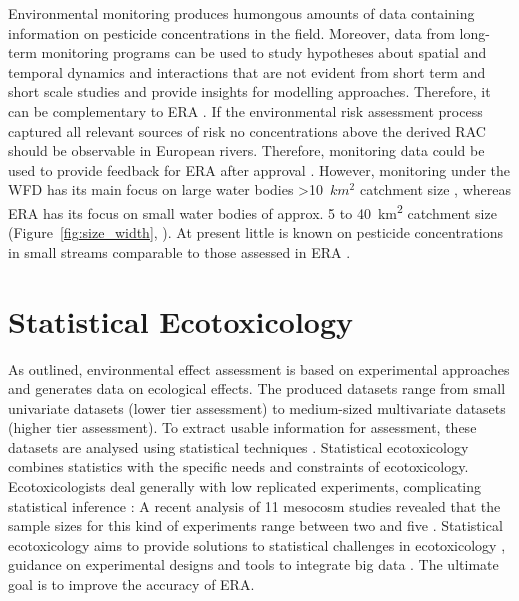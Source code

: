 Environmental monitoring produces humongous amounts of data containing information on pesticide concentrations in the field.
Moreover, data from long-term monitoring programs can be used to study hypotheses about spatial and temporal dynamics and interactions that are not evident from short term and short scale studies \citep{gitzen_design_2012} and provide insights for modelling approaches. 
Therefore, it can be complementary to ERA \citep{suter_ecological_2007}.
If the environmental risk assessment process captured all relevant sources of risk no concentrations above the derived RAC should be observable in European rivers. 
Therefore, monitoring data could be used to provide feedback for ERA after approval \citep{knauer_pesticides_2016}. 
However, monitoring under the WFD has its main focus on large water bodies \textgreater 10~$km^2$ catchment size \citep{european_union_directive_2000}, whereas ERA has its focus on small water bodies of approx. 5 to 40~km\textsuperscript{2} catchment size (Figure~\ref{fig:size_width}, \citet{european_union_regulation_2009, brock_aquatic_2006}).
At present little is known on pesticide concentrations in small streams comparable to those assessed in ERA \citep{lorenz_specifics_2016, biggs_importance_2016}. 



\section{Statistical Ecotoxicology}

As outlined, environmental effect assessment is based on experimental approaches and generates data on ecological effects.
The produced datasets range from small univariate datasets (lower tier assessment) to medium-sized multivariate datasets (higher tier assessment).
To extract usable information for assessment, these datasets are analysed using statistical techniques \citep{newman_quantitative_2012}. 
Statistical ecotoxicology combines statistics with the specific needs and constraints of ecotoxicology. 
Ecotoxicologists deal generally with low replicated experiments, complicating statistical inference \citep{van_der_hoeven_power_1998}:
A recent analysis of 11 mesocosm studies revealed that the sample sizes for this kind of experiments range between two and five \citep{szocs_analysing_2015}.
Statistical ecotoxicology aims to provide solutions to statistical challenges in ecotoxicology \citep{fox_comment_2016}, guidance on experimental designs \citep{johnson_power_2015} and tools to integrate big data \citep {van_den_brink_new_2016}.
The ultimate goal is to improve the accuracy of ERA. 

